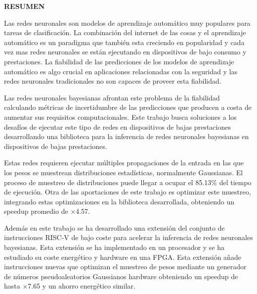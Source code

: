 \begin{center}

\vspace{1cm}
{\Large \bfseries RESUMEN}

\vspace{2.5cm}
\end{center}

Las redes neuronales son modelos de aprendizaje automático muy populares para tareas de clasificación. La combinación del internet de las cosas y el aprendizaje automático es un paradigma que también esta creciendo en popularidad y cada vez mas redes neuronales se están ejecutando en dispositivos de bajo consumo y prestaciones. La fiabilidad de las predicciones de los modelos de aprendizaje automático es algo crucial en aplicaciones relacionadas con la seguridad y las redes neuronales tradicionales no son capaces de proveer esta fiabilidad. 

Las redes neuronales bayesianas afrontan este problema de la fiabilidad calculando métricas de incertidumbre de las predicciones que producen a costa de aumentar sus requisitos computacionales. Este trabajo busca soluciones a los desafíos de ejecutar este tipo de redes en dispositivos de bajas prestaciones desarrollando una biblioteca para la inferencia de redes neuronales bayesianas en dispositivos de bajas prestaciones. 

Estas redes requieren ejecutar múltiples propagaciones de la entrada en las que los pesos se muestrean distribuciones estadísticas, normalmente Gaussianas. El proceso de muestreo de distribuciones puede llegar a ocupar el 85.13\% del tiempo de ejecución. Otra de las aportaciones de este trabajo es optimizar este muestreo, integrando estas optimizaciones en la biblioteca desarrollada, obteniendo un speedup promedio de ×4.57. 

Además en este trabajo se ha desarrollado una extensión del conjunto de instrucciones RISC-V de bajo coste para acelerar la inferencia de redes neuronales bayesianas. Esta extensión se ha implementado en un procesador y se ha estudiado su coste energético y hardware en una FPGA. Esta extensión añade instrucciones nuevas que optimizan el muestreo de pesos mediante un generador de números pseudoaleatorios Gaussianos hardware obteniendo un speedup de hasta ×7.65 y un ahorro energético similar.
